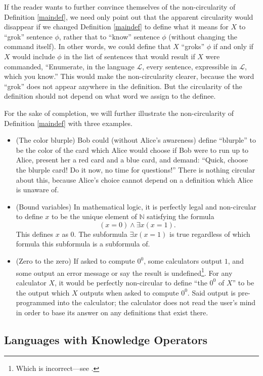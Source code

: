 \documentclass[runningheads]{llncs}
\begin{document}
If the reader wants to further convince themselves of the non-circularity of Definition
\ref{maindef}, we need only point out that the apparent circularity would disappear if
we changed Definition \ref{maindef} to define what it means for $X$ to ``grok'' sentence
$\phi$, rather that to ``know'' sentence $\phi$ (without changing the command itself).
In other words, we could define that $X$ ``groks'' $\phi$ if and only if $X$ would include
$\phi$ in the list of sentences that would result if $X$ were commanded,
``Enumerate, in the language $\mathscr L$, every sentence,
  expressible in $\mathscr L$, which you know.''
This would make the non-circularity clearer, because the word ``grok'' does not appear
anywhere in the definition. But the circularity of the definition should not depend on
what word we assign to the definee.

For the sake of completion, we will further illustrate the non-circularity of
Definition \ref{maindef} with three examples.
\begin{itemize}
  \item
  (The color blurple) Bob could (without Alice's awareness) define ``blurple'' to be the
  color of the card
  which Alice would choose if Bob were to run up to Alice, present her a red card
  and a blue card, and demand: ``Quick, choose the blurple card! Do it now, no time
  for questions!'' There is nothing circular about this, because Alice's choice
  cannot depend on a definition which Alice is unaware of.
  \item
  (Bound variables) In mathematical logic, it is perfectly legal and non-circular to
  define $x$ to be the unique element of $\mathbb N$ satisfying the formula
  \[(x=0)\wedge \exists x(x=1).\]
  This defines $x$ as $0$. The subformula
  $\exists x(x=1)$ is true regardless of which formula this subformula is a subformula of.
  \item
  (Zero to the zero) If asked to compute $0^0$, some calculators output $1$, and some
  output an error message or say the result is undefined\footnote{Which is incorrect---see
  \cite{knuth}.}. For any calculator $X$, it
  would be perfectly non-circular to define ``the $0^0$ of $X$'' to be the output which
  $X$ outputs when asked to compute $0^0$. Said output is pre-programmed into the
  calculator; the calculator does not read the user's mind in order to base its answer
  on any definitions that exist there.
\end{itemize}

\subsection{Languages with Knowledge Operators}
\end{document}
